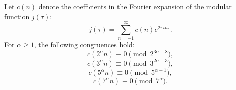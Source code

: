 Let $c(n)$ denote the coefficients in the Fourier expansion of the modular function $j(\tau)$:
$$j(\tau) = \sum_{n=-1}^{\infty} c(n) e^{2\pi i n \tau}.$$
For $\alpha \geq 1$, the following congruences hold:
$$c(2^\alpha n) \equiv 0 \pmod{2^{3\alpha+8}},$$
$$c(3^\alpha n) \equiv 0 \pmod{3^{2\alpha+3}},$$
$$c(5^\alpha n) \equiv 0 \pmod{5^{\alpha+1}},$$
$$c(7^\alpha n) \equiv 0 \pmod{7^\alpha}.$$
